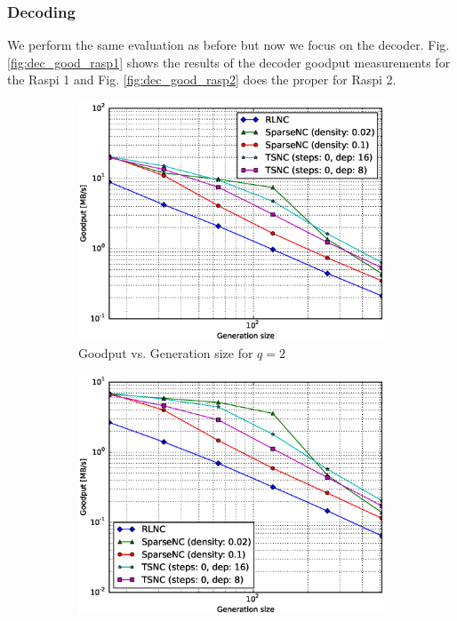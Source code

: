 \subsubsection{Decoding}

We perform the same evaluation as before but now we focus on the decoder.
Fig. \ref{fig:dec_good_rasp1} shows the results of the decoder goodput
measurements for the \ac{Raspi} 1 and Fig. \ref{fig:dec_good_rasp2} does
the proper for \ac{Raspi} 2.

\begin{figure}
    \centering
    \begin{subfigure}[b]{0.475\textwidth}
        \centering
        \includegraphics[width=1.15\textwidth]{images/23_07_2015/goodput_vs_generation_size_Rasp_decoder_Binary_1600.eps}
        \caption[]%
        {{\small Goodput vs. Generation size for $q = 2$}}
        \label{fig:dec_good_rasp1_gen_gf2}
    \end{subfigure}
    \hfill
    \begin{subfigure}[b]{0.475\textwidth}
        \centering
        \includegraphics[width=1.15\textwidth]{images/23_07_2015/goodput_vs_generation_size_Rasp_decoder_Binary8_1600.eps}

\end{subfigure}
\end{figure}
